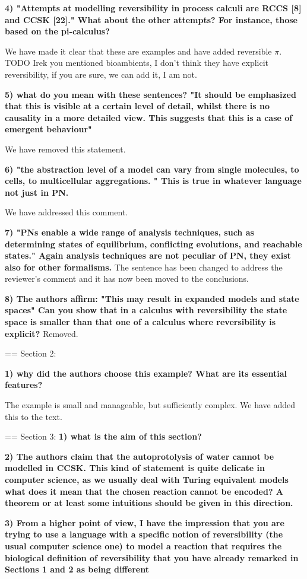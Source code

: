 \documentclass{article}
\begin{document}
\textbf{4) "Attempts at modelling reversibility in process calculi are RCCS [8] and CCSK [22]." What about the other attempts? For instance, those based on the pi-calculus?}

We have made it clear that these are examples and have added reversible $\pi$. TODO Irek you mentioned bioambients, I don't think they have explicit reversibility, if you are sure, we can add it, I am not.

\textbf{5) what do you mean with these sentences? "It should be emphasized that this is visible at a certain level of detail, whilst there is no causality in a more detailed view. This suggests that this is a case of emergent behaviour"}

We have removed this statement.

\textbf{6) "the abstraction level of a model can vary from single molecules, to cells, to multicellular aggregations. "
This is true in whatever language not just in PN.}

We have addressed this comment. 

\textbf{7) "PNs enable a wide range of analysis techniques, such as determining states of equilibrium, conflicting evolutions, and reachable states."
Again analysis techniques are not peculiar of PN, they exist also for other formalisms.}
The sentence has been changed to address the reviewer's comment and it has now been moved to the conclusions. 

\textbf{8) The authors affirm: 
"This may result in expanded models and state spaces" Can you show that in a calculus with reversibility the state space is smaller than that one of a calculus where reversibility is explicit?}
Removed.

== Section 2: 

\textbf{1) why did the authors choose this example? What are its essential features?}

The example is small and manageable, but sufficiently complex. We have added this to the text.


== Section 3:
\textbf{1) what is the aim of this section?}

\textbf{2) The authors claim that the autoprotolysis of water cannot be modelled in CCSK.
This kind of statement is quite delicate in computer science, as we usually deal with Turing equivalent models what does it mean that the chosen reaction cannot be encoded? A theorem or at least some intuitions should be given in this direction.}

\textbf{3) From a higher point of view, I have the impression that you are trying to use a language with a specific notion of reversibility (the usual computer science one) to model a reaction that requires the biological definition of reversibility that you have already remarked in Sections 1 and 2 as being different}
\end{document}
